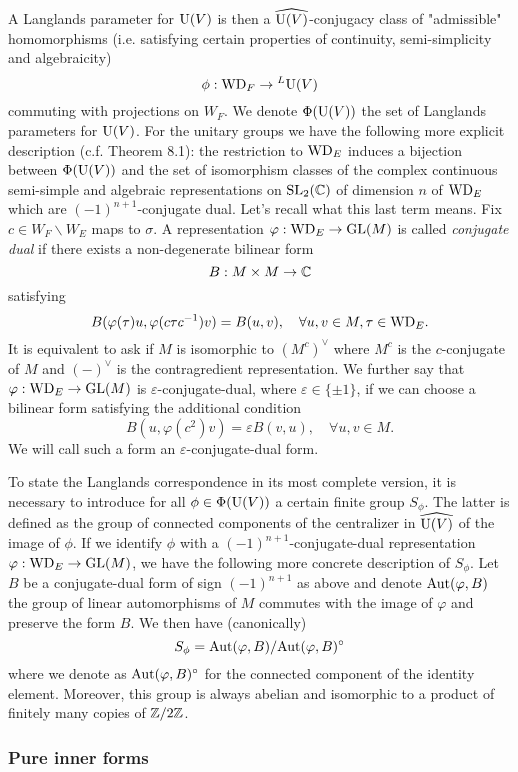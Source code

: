 A Langlands parameter for $\mathrm{U}(V)$ is then a $\widehat{\mathrm{U}(V)}$-conjugacy class of "admissible" homomorphisms (i.e. satisfying certain properties of continuity, semi-simplicity and algebraicity)
\[
    \phi: \mathrm{WD}_F \to {}^L \mathrm{U}(V)
\]
commuting with projections on $W_F$.
We denote $\Phi(\mathrm{U}(V))$ the set of Langlands parameters for $\mathrm{U}(V)$.
For the unitary groups we have the following more explicit description (c.f. \cite{gan2011symplectic} Theorem 8.1): the restriction to $\mathrm{WD}_E$ induces a bijection between $\Phi(\mathrm{U}(V))$ and the set of isomorphism classes of the complex continuous semi-simple and algebraic representations on $\mathrm{SL}_2(\mathbb{C})$ of dimension $n$ of $\mathrm{WD}_E$ which are $(-1)^{n+1}$-conjugate dual.
Let's recall what this last term means.
Fix $c \in W_F \backslash W_E$ maps to $\sigma$.
A representation $\varphi: \mathrm{WD}_E \to \mathrm{GL}(M)$ is called \emph{conjugate dual} if there exists a non-degenerate bilinear form
\[
    B: M \times M \to \mathbb{C}
\]
satisfying
\[
    B(\varphi(\tau)u, \varphi(c\tau c^{-1})v) = B(u, v), \quad \forall u, v \in M, \tau \in \mathrm{WD}_E.
\]
It is equivalent to ask if $M$ is isomorphic to $(M^c)^\vee$ where $M^c$ is the $c$-conjugate of $M$ and $(-)^\vee$ is the contragredient representation.
We further say that $\varphi: \mathrm{WD}_E \to \mathrm{GL}(M)$ is $\varepsilon$-conjugate-dual, where $\varepsilon \in \{\pm 1\}$, if we can choose a bilinear form satisfying the additional condition
\[
    B(u, \varphi(c^2)v) = \varepsilon B(v, u), \quad \forall u, v \in M.
\]
We will call such a form an $\varepsilon$-conjugate-dual form.

To state the Langlands correspondence in its most complete version, it is necessary to introduce for all $\phi \in \Phi(\mathrm{U}(V))$ a certain finite group $S_\phi$.
The latter is defined as the group of connected components of the centralizer in $\widehat{\mathrm{U}(V)}$ of the image of $\phi$.
If we identify $\phi$ with a $(-1)^{n+1}$-conjugate-dual representation $\varphi: \mathrm{WD}_E \to \mathrm{GL}(M)$, we have the following more concrete description of $S_\phi$.
Let $B$ be a conjugate-dual form of sign $(-1)^{n+1}$ as above and denote $\mathrm{Aut}(\varphi, B)$ the group of linear automorphisms of $M$ commutes with the image of $\varphi$ and preserve the form $B$.
We then have (canonically)
\[S_\phi = \mathrm{Aut}(\varphi, B) / \mathrm{Aut}(\varphi, B)^\circ\]
where we denote as $\mathrm{Aut}(\varphi, B)^\circ$ for the connected component of the identity element.
Moreover, this group is always abelian and isomorphic to a product of finitely many copies of $\mathbb{Z} / 2\mathbb{Z}$.


\subsubsection{Pure inner forms}

